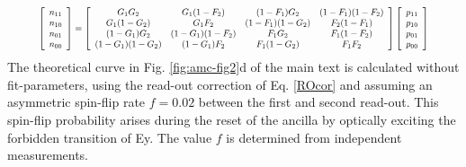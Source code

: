 \begin{equation}
\resizebox{.9\hsize}{!}{$
\left[
\begin{array}{c}
n_{11}\\
n_{10}\\
n_{01}\\
n_{00}
 \end{array}
 \right]=
 \left[
\begin{array}{cccc}
G_1 G_2 & G_1(1-F_2) & (1-F_1)G_2 & (1-F_1)(1-F_2)\\
G_1(1-G_2) & G_1 F_2 & (1-F_1)(1-G_2) & F_2(1-F_1)\\
(1-G_1)G_2 & (1-G_1)(1-F_2) & F_1 G_2 & F_1(1-F_2)\\
(1-G_1)(1-G_2) & (1-G_1)F_2 & F_1 (1-G_2) & F_1 F_2
 \end{array}
 \right]
\left[
\begin{array}{c}
p_{11}\\
p_{10}\\
p_{01}\\
p_{00}
 \end{array}
 \right] $}
\label{ROcor}
\end{equation}
The theoretical curve in Fig. \ref{fig:amc-fig2}d of the main text is calculated without fit-parameters, using the read-out correction of Eq. \ref{ROcor} and assuming an asymmetric spin-flip rate $f= 0.02$ between the first and second read-out. This spin-flip probability arises during the reset of the ancilla by optically exciting the forbidden transition of Ey. The value $f$ is determined from independent measurements. \\


